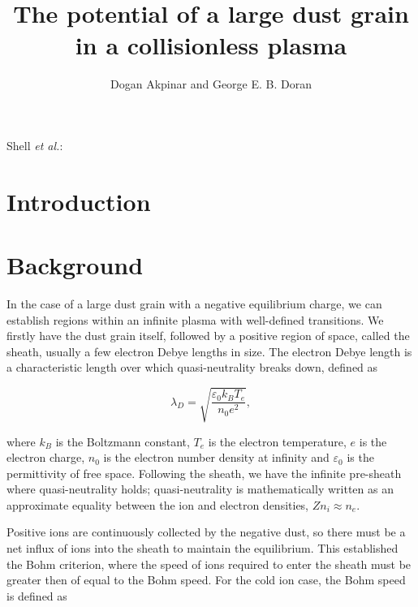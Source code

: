 \documentclass{article}
\begin{document}
\title{The potential of a large dust grain in a collisionless plasma}
\author{Dogan Akpinar and George E. B. Doran}
{Shell \MakeLowercase{\textit{et al.}}:}

\maketitle

\begin{abstract}

\end{abstract}

\section{Introduction}

\section{Background}

In the case of a large dust grain with a negative equilibrium charge, we can establish regions within an infinite plasma with well-defined
transitions. We firstly have the dust grain itself, followed
by a positive region of space, called the sheath, usually a few electron Debye lengths
in size. The electron Debye length is a characteristic length over which quasi-neutrality breaks down, 
defined as

\begin{equation}\label{eq:Debye}
\lambda_D = \sqrt{\frac{\varepsilon_{0} k_{B} T_{e}}{n_{0} e^2}},
\end{equation}

\smallskip

\noindent where $k_B$ is the Boltzmann constant, $T_e$ is the electron temperature, $e$ is the 
electron charge, $n_0$ is the electron number density at infinity and $\varepsilon_{0}$ is the
permittivity of free space. Following the sheath, we have the infinite pre-sheath where quasi-neutrality holds;
quasi-neutrality is mathematically written as an approximate equality between the ion and electron
densities, $Zn_i \approx n_e$.

\medskip

Positive ions are continuously collected by the negative dust, so there must be
a net influx of ions into the sheath to maintain the equilibrium. This established the Bohm
criterion, where the speed of ions required to enter the sheath must be 
greater then of equal to the Bohm speed. For the cold ion case, the Bohm speed is defined as
\end{document}
